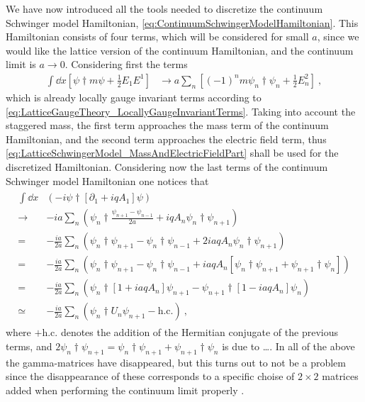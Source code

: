 \documentclass[../main.tex]{subfiles} %
\begin{document}
We have now introduced all the tools needed to discretize the continuum Schwinger model Hamiltonian, \cref{eq:ContinuumSchwingerModelHamiltonian}. This Hamiltonian consists of four terms, which will be considered for small $a$, since we would like the lattice version of the continuum Hamiltonian, and the continuum limit is $a \rightarrow 0$. Considering first the terms
\begin{align} \label{eq:LatticeSchwingerModel_MassAndElectricFieldPart}
    \int \dd{x} \left[ \psi\dagger m \psi + \frac{1}{2} E_1 E^1 \right]
    &\rightarrow a \sum_n \left[ (-1)^n m \psi_n\dagger \psi_n + \frac{1}{2} E_n^2 \right] \: ,
\end{align}
which is already locally gauge invariant terms according to \cref{eq:LatticeGaugeTheory_LocallyGaugeInvariantTerms}. Taking into account the staggered mass, the first term approaches the mass term of the continuum Hamiltonian, and the second term approaches the electric field term, thus \cref{eq:LatticeSchwingerModel_MassAndElectricFieldPart} shall be used for the discretized Hamiltonian. Considering now the last terms of the continuum Schwinger model Hamiltonian one notices that
\begin{align} \label{eq:LatticeSchwingerModel_DifferentialPart}
\begin{split}
    \int \dd{x} &\left( -i\psi\dagger \left[ \partial_1 + iqA_1 \right] \psi \right) \\
    \rightarrow& -ia \sum_n \left( \psi_n\dagger \frac{\psi_{n+1} - \psi_{n-1}}{2a} + iqA_n \psi_n\dagger \psi_{n+1} \right) \\
    =& -\frac{ia}{2a} \sum_n \left( \psi_n\dagger \psi_{n+1} - \psi_n\dagger \psi_{n-1} + 2 iaqA_n \psi_n\dagger \psi_{n+1} \right) \\
    =& -\frac{ia}{2a} \sum_n \left( \psi_n\dagger \psi_{n+1} - \psi_n\dagger \psi_{n-1} + iaqA_n \left[ \psi_n\dagger \psi_{n+1} + \psi_{n+1}\dagger \psi_n \right] \right) \\
    =& -\frac{ia}{2a} \sum_n \left( \psi_n\dagger \left[ 1 + iaqA_n \right] \psi_{n+1} - \psi_{n+1}\dagger \left[ 1 - iaqA_n \right] \psi_n \right) \\
    \simeq& -\frac{ia}{2a} \sum_n \left( \psi_n\dagger U_n \psi_{n+1} - \mathrm{h.c.} \right) \: ,
\end{split}
\end{align}
where $+\mathrm{h.c.}$ denotes the addition of the Hermitian conjugate of the previous terms, and $2\psi_n\dagger \psi_{n+1} = \psi_n\dagger \psi_{n+1} + \psi_{n+1}\dagger \psi_n$ is due to \ldots . In all of the above the gamma-matrices have disappeared, but this turns out to not be a problem since the disappearance of these corresponds to a specific choise of $2 \times 2$ matrices added when performing the continuum limit properly \cite{panyella_masterThesis_2019}.
\end{document}
